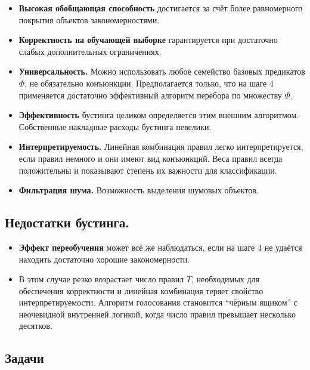\begin{itemize}
    \item \textbf{Высокая обобщающая способность} достигается за счёт более равномерного покрытия объектов закономерностями.

    \item \textbf{Корректность на обучающей выборке} гарантируется при достаточно слабых дополнительных ограничениях.

    \item \textbf{Универсальность.} Можно использовать любое семейство базовых предикатов $\Phi$, не обязательно конъюнкции. Предполагается только, что на шаге 4 применяется достаточно эффективный алгоритм перебора по множеству $\Phi$.

    \item \textbf{Эффективность} бустинга целиком определяется этим внешним алгоритмом. Собственные накладные расходы бустинга невелики.

    \item \textbf{Интерпретируемость.} Линейная комбинация правил легко интерпретируется, если правил немного и они имеют вид конъюнкций. Веса правил всегда положительны и показывают степень их важности для классификации.

    \item \textbf{Фильтрация шума.} Возможность выделения шумовых объектов.
\end{itemize}

\subsection*{Недостатки бустинга.}

\begin{itemize}
    \item \textbf{Эффект переобучения} может всё же наблюдаться, если на шаге 4 не удаётся находить достаточно хорошие закономерности.

    \item В этом случае резко возрастает число правил $T$, необходимых для обеспечения корректности и линейная комбинация теряет свойство интерпретируемости. Алгоритм голосования становится ``чёрным ящиком'' с неочевидной внутренней логикой, когда число правил превышает несколько десятков.
\end{itemize}

\subsection{Задачи}

